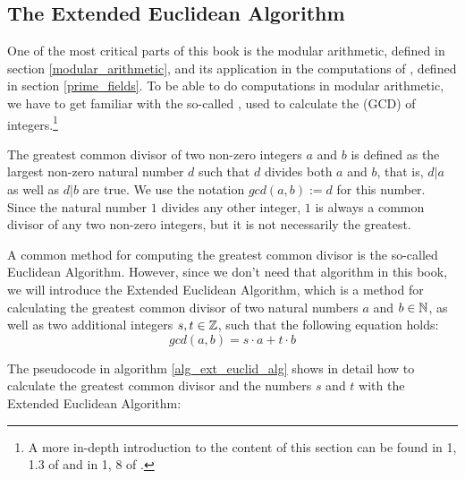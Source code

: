 \subsection{The Extended Euclidean Algorithm}
One of the most critical parts of this book is the modular arithmetic, defined in section \ref{modular_arithmetic}, and its application in the computations of , defined in section \ref{prime_fields}. To be able to do computations in modular arithmetic, we have to get familiar with the so-called , used to calculate the  (GCD) of integers.\footnote{A more in-depth introduction to the content of this section can be found in \chaptname{} 1, \secname{} 1.3 of \cite{cohen-2010} and in \chaptname{} 1, \secname{} 8 of \cite{mignotte-1992}.}

The {greatest common divisor} of two non-zero integers $a$ and $b$ is defined as the largest non-zero natural number $d$ such that $d$ divides both $a$ and $b$, that is, $d|a$ as well as $d|b$ are true. We use the notation $ gcd (a, b):=d $ for this number. Since the natural number $1$ divides any other integer, $1$ is always a common divisor of any two non-zero integers, but it is not necessarily the greatest.

A common method for computing the greatest common divisor is the so-called Euclidean Algorithm. However, since we don't need that algorithm in this book, we will introduce the Extended Euclidean Algorithm, which is a method for calculating the greatest common divisor of two natural numbers $ a $ and $ b \in \mathbb{N} $, as well as two additional integers $ s, t \in \mathbb{Z} $, such that the following equation holds:
\begin{equation}
\label{eq: erw_Eukl_algo}
gcd (a, b) = s \cdot a + t \cdot b
\end{equation}

The pseudocode in algorithm \ref{alg_ext_euclid_alg} shows in detail how to calculate the greatest common divisor and the numbers $s$ and $t$ with the Extended Euclidean Algorithm:

